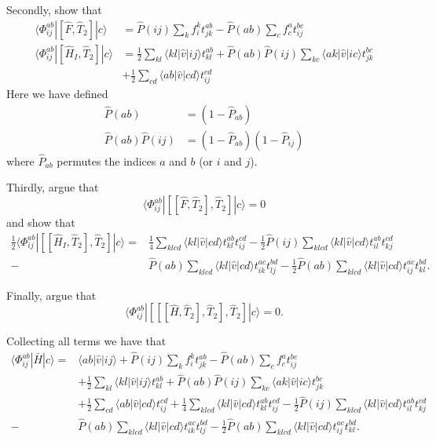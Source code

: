 \documentclass[a4paper,10pt]{article}
\newcommand{\braket}[1]{\langle#1\rangle}
\theoremstyle{definition}
\begin{document}
Secondly, show that 
\begin{align}
 \braket{\Phi^{ab}_{ij}|[\hat{F},\hat{T}_2]|c} &= \hat{P} (ij) \sum_ k  f^{k}_{i} t^{ab}_{jk}  - \hat{P} (ab) \sum_c f^{a}_{c} t^{bc}_{ij} \\
 \braket{\Phi^{ab}_{ij}|[\hat{H}_I,\hat{T}_2]|c} &= \frac{1}{2} \sum_{kl} \braket{kl|\hat{v}|ij} t^{ab}_{kl} + \hat{P}(ab) \hat{P}(ij) \sum_{kc} \braket{ak|\hat{v}|ic} t^{bc}_{jk}  \nonumber \\
 &+ \frac{1}{2} \sum_{cd} \braket{ab|\hat{v}|cd} t^{cd}_{ij}
\end{align}
Here we have defined 
\begin{align}
 \hat{P}(ab) &= \left( 1 - \hat{P}_{ab} \right) \\
 \hat{P}(ab) \hat{P}(ij) &= \left( 1 - \hat{P}_{ab} \right)\left( 1 - \hat{P}_{ij} \right)
\end{align}
where $\hat{P}_{ab}$ permutes the indices $a$ and $b$ (or $i$ and $j$). 

Thirdly, argue that 
\begin{equation}
 \braket{\Phi^{ab}_{ij}|[[\hat{F},\hat{T}_2],\hat{T}_2]|c} = 0
\end{equation}
and show that 
\begin{align}
 \frac{1}{2} \braket{\Phi^{ab}_{ij}|[[\hat{H}_I,\hat{T}_2],\hat{T}_2]|c} =  &\frac{1}{4} \sum_{klcd} \braket{kl|\hat{v}|cd} t^{ab}_{kl} t^{cd}_{ij} -  \frac{1}{2}\hat{P} (ij) \sum_{klcd} \braket{kl|\hat{v}|cd} t^{ab}_{il} t^{cd}_{kj} \nonumber \\
 - & \hat{P} (ab) \sum_{klcd} \braket{kl|\hat{v}|cd} t^{ac}_{ik} t^{bd}_{lj}  - \frac{1}{2} \hat{P}(ab) \sum_{klcd} \braket{kl|\hat{v}|cd} t^{ac}_{ij}t^{bd}_{kl} .
\end{align}

Finally, argue that 
\begin{equation}
 \braket{\Phi^{ab}_{ij}|[[[\hat{H},\hat{T}_2],\hat{T}_2],\hat{T}_2]|c} = 0.
\end{equation}

Collecting all terms we have that 
\begin{align}
 \braket{\Phi^{ab}_{ij}|\bar{H}|c} = &\braket{ab|\hat{v}|ij} + \hat{P} (ij) \sum_ k  f^{k}_{i} t^{ab}_{jk}  - \hat{P} (ab) \sum_c f^{a}_{c} t^{bc}_{ij} \nonumber \\
 &+\frac{1}{2} \sum_{kl} \braket{kl|\hat{v}|ij} t^{ab}_{kl} + \hat{P}(ab) \hat{P}(ij) \sum_{kc} \braket{ak|\hat{v}|ic} t^{bc}_{jk}  \nonumber \\
 &+ \frac{1}{2} \sum_{cd} \braket{ab|\hat{v}|cd} t^{cd}_{ij} + \frac{1}{4} \sum_{klcd} \braket{kl|\hat{v}|cd} t^{ab}_{kl} t^{cd}_{ij} -  \frac{1}{2}\hat{P} (ij) \sum_{klcd} \braket{kl|\hat{v}|cd} t^{ab}_{il} t^{cd}_{kj} \nonumber \\
 - & \hat{P} (ab) \sum_{klcd} \braket{kl|\hat{v}|cd} t^{ac}_{ik} t^{bd}_{lj}  - \frac{1}{2} \hat{P}(ab) \sum_{klcd} \braket{kl|\hat{v}|cd} t^{ac}_{ij}t^{bd}_{kl} \label{amplitudeExpression}.
\end{align}
\end{document}
